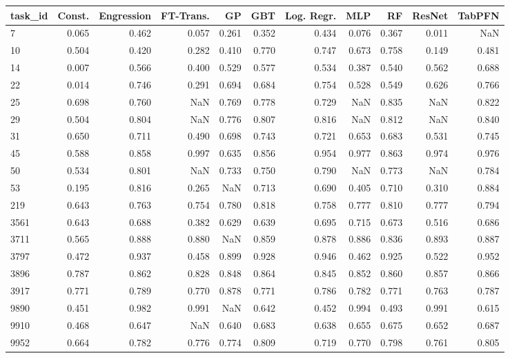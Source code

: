 \begin{tabular}{lrrrrrrrrrr}
\toprule
task\_id & Const. & Engression & FT-Trans. & GP & GBT & Log. Regr. & MLP & RF & ResNet & TabPFN \\
\midrule
7 & 0.065 & 0.462 & 0.057 & 0.261 & 0.352 & 0.434 & 0.076 & 0.367 & 0.011 & NaN \\
10 & 0.504 & 0.420 & 0.282 & 0.410 & 0.770 & 0.747 & 0.673 & 0.758 & 0.149 & 0.481 \\
14 & 0.007 & 0.566 & 0.400 & 0.529 & 0.577 & 0.534 & 0.387 & 0.540 & 0.562 & 0.688 \\
22 & 0.014 & 0.746 & 0.291 & 0.694 & 0.684 & 0.754 & 0.528 & 0.549 & 0.626 & 0.766 \\
25 & 0.698 & 0.760 & NaN & 0.769 & 0.778 & 0.729 & NaN & 0.835 & NaN & 0.822 \\
29 & 0.504 & 0.804 & NaN & 0.776 & 0.807 & 0.816 & NaN & 0.812 & NaN & 0.840 \\
31 & 0.650 & 0.711 & 0.490 & 0.698 & 0.743 & 0.721 & 0.653 & 0.683 & 0.531 & 0.745 \\
45 & 0.588 & 0.858 & 0.997 & 0.635 & 0.856 & 0.954 & 0.977 & 0.863 & 0.974 & 0.976 \\
50 & 0.534 & 0.801 & NaN & 0.733 & 0.750 & 0.790 & NaN & 0.773 & NaN & 0.784 \\
53 & 0.195 & 0.816 & 0.265 & NaN & 0.713 & 0.690 & 0.405 & 0.710 & 0.310 & 0.884 \\
219 & 0.643 & 0.763 & 0.754 & 0.780 & 0.818 & 0.758 & 0.777 & 0.810 & 0.777 & 0.794 \\
3561 & 0.643 & 0.688 & 0.382 & 0.629 & 0.639 & 0.695 & 0.715 & 0.673 & 0.516 & 0.686 \\
3711 & 0.565 & 0.888 & 0.880 & NaN & 0.859 & 0.878 & 0.886 & 0.836 & 0.893 & 0.887 \\
3797 & 0.472 & 0.937 & 0.458 & 0.899 & 0.928 & 0.946 & 0.462 & 0.925 & 0.522 & 0.952 \\
3896 & 0.787 & 0.862 & 0.828 & 0.848 & 0.864 & 0.845 & 0.852 & 0.860 & 0.857 & 0.866 \\
3917 & 0.771 & 0.789 & 0.770 & 0.878 & 0.771 & 0.786 & 0.782 & 0.771 & 0.763 & 0.787 \\
9890 & 0.451 & 0.982 & 0.991 & NaN & 0.642 & 0.452 & 0.994 & 0.493 & 0.991 & 0.615 \\
9910 & 0.468 & 0.647 & NaN & 0.640 & 0.683 & 0.638 & 0.655 & 0.675 & 0.652 & 0.687 \\
9952 & 0.664 & 0.782 & 0.776 & 0.774 & 0.809 & 0.719 & 0.770 & 0.798 & 0.761 & 0.805 \\

\end{tabular}
